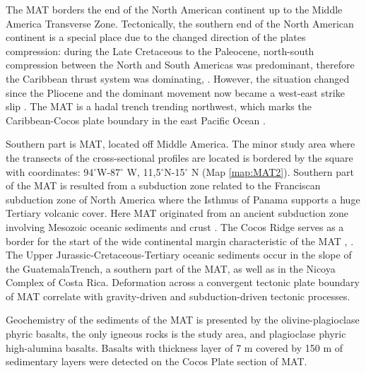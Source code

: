 \documentclass[11pt,a4paper]{report}
\begin{document}
The \ac{MAT} borders the end of the North American continent up to the Middle America Transverse Zone. Tectonically, the southern end of the North American continent is a special place due to the changed direction of the plates compression: during the Late Cretaceous to the Paleocene, north-south compression between the North and South Americas was predominant, therefore the Caribbean thrust system was dominating, \cite{Lemenkova2019108}. However, the situation changed since the Pliocene and the dominant movement now became a west-east strike slip \cite{Aubouinetal1982}. The \ac{MAT} is a hadal trench trending northwest, which marks the Caribbean-Cocos plate boundary in the east Pacific Ocean \cite{Guzmanetal2006}. 

Southern part is \ac{MAT}, located off Middle America. The minor study area where the transects of the cross-sectional profiles are located is bordered by the square with coordinates: 94$^{\circ}$W-87$^{\circ}$ W, 11,5$^{\circ}$N-15$^{\circ}$ N (Map \ref{map:MAT2}). Southern part of the \ac{MAT} is resulted from a subduction zone related to the Franciscan subduction zone of North America where the Isthmus of Panama supports a huge Tertiary volcanic cover. Here \ac{MAT} originated from an ancient subduction zone involving Mesozoic oceanic sediments and crust \cite{Aubouinetal1982}. The Cocos Ridge serves as a border for the start of the wide continental margin characteristic of the \ac{MAT} \cite{Morgan1968}, \cite{Lemenkova2019108}. The Upper Jurassic-Cretaceous-Tertiary oceanic sediments occur in the slope of the GuatemalaTrench, a southern part of the \ac{MAT}, as well as in the Nicoya Complex of Costa Rica. Deformation across a convergent tectonic plate boundary of \ac{MAT} correlate with gravity-driven and subduction-driven tectonic processes. 

Geochemistry of the sediments of the \ac{MAT} is presented by the olivine-plagioclase phyric basalts, the only igneous rocks is the study area, and plagioclase phyric high-alumina basalts. Basalts with thickness layer of 7 m covered by 150 m of sedimentary layers were detected on the Cocos Plate section of \ac{MAT}. 
\end{document}
